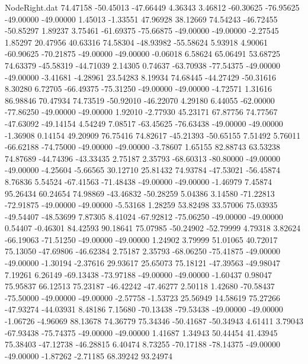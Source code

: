 \begin{filecontents}{NodeRight.dat}
  74.47158  -50.45013  -47.66449     4.36343    3.46812  -60.30625  -76.95625  -49.00000  -49.00000    1.45013   -1.33551   47.96928   38.12669
  74.54243  -46.72455  -50.85297     1.89237    3.75461  -61.69375  -75.66875  -49.00000  -49.00000   -2.27545    1.85297   20.47956   40.63316
  74.58304  -48.93982  -55.58624     5.93918    4.90061  -60.90625  -70.21875  -49.00000  -49.00000   -0.06018    6.58624   65.06491   53.68725
  74.63379  -45.58319  -44.71039     2.14305    0.74637  -63.70938  -77.54375  -49.00000  -49.00000   -3.41681   -4.28961   23.54283    8.19934
  74.68445  -44.27429  -50.31616     8.30280    6.72705  -66.49375  -75.31250  -49.00000  -49.00000   -4.72571    1.31616   86.98846   70.47934
  74.73519  -50.92010  -46.22070     4.29180    6.44055  -62.00000  -77.86250  -49.00000  -49.00000    1.92010   -2.77930   45.23171   67.87756
  74.77567  -47.63092  -49.14154     4.54249    7.08517  -63.45625  -76.63438  -49.00000  -49.00000   -1.36908    0.14154   49.20909   76.75416
  74.82617  -45.21393  -50.65155     7.51492    5.76011  -66.62188  -74.75000  -49.00000  -49.00000   -3.78607    1.65155   82.88743   63.53238
  74.87689  -44.74396  -43.33435     2.75187    2.35793  -68.60313  -80.80000  -49.00000  -49.00000   -4.25604   -5.66565   30.12710   25.81432
  74.93784  -47.53021  -56.45874     8.76836    5.54524  -67.41563  -71.48438  -49.00000  -49.00000   -1.46979    7.45874   95.26434   60.24654
  74.98869  -43.46832  -50.28259     5.04386    3.14580  -71.22813  -72.91875  -49.00000  -49.00000   -5.53168    1.28259   53.82498   33.57006
  75.03935  -49.54407  -48.53699     7.87305    8.41024  -67.92812  -75.06250  -49.00000  -49.00000    0.54407   -0.46301   84.42593   90.18641
  75.07985  -50.24902  -52.79999     4.79318    3.82624  -66.19063  -71.51250  -49.00000  -49.00000    1.24902    3.79999   51.01065   40.72017
  75.13050  -47.69806  -46.62384     2.75187    2.35793  -68.06250  -75.41875  -49.00000  -49.00000   -1.30194   -2.37616   29.93617   25.65073
  75.18121  -47.39563  -49.98047     7.19261    6.26149  -69.13438  -73.97188  -49.00000  -49.00000   -1.60437    0.98047   75.95837   66.12513
  75.23187  -46.42242  -47.46277     2.50118    1.42680  -70.58437  -75.50000  -49.00000  -49.00000   -2.57758   -1.53723   25.56949   14.58619
  75.27266  -47.93274  -44.03931     8.48186    7.15680  -70.13438  -79.53438  -49.00000  -49.00000   -1.06726   -4.96069   88.13678   74.36779
  75.34346  -50.41687  -50.34943     4.61411    3.79043  -67.93438  -75.74375  -49.00000  -49.00000    1.41687    1.34943   50.44454   41.43945
  75.38403  -47.12738  -46.28815     6.40474    8.73255  -70.17188  -78.14375  -49.00000  -49.00000   -1.87262   -2.71185   68.39242   93.24974

\end{filecontents}
